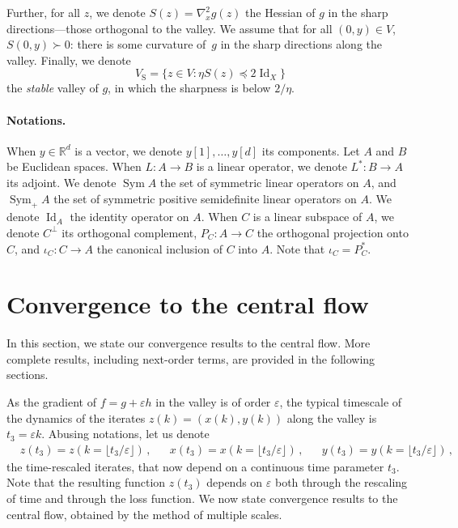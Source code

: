 \documentclass[11pt,english,reqno]{article}
\DeclareMathOperator{\Id}{Id}
\DeclareMathOperator{\Sym}{Sym}
\newcommand{\R}{\mathbb{R}}
\theoremstyle{plain}
\theoremstyle{definition}
\theoremstyle{remark}
\numberwithin{equation}{section}
\begin{document}
Further, for all $z$, we denote $S(z) = \nabla^2_x g(z)$ the Hessian of $g$ in the sharp directions---those orthogonal to the valley. We assume that for all $(0,y) \in V$, $S(0, y) \succ 0$: there is some curvature of~$g$ in the sharp directions along the valley. Finally, we denote 
\begin{equation*}
    V_{\mathrm{S}} = \{ z \in V : \eta S(z) \preccurlyeq 2 \Id_X\} 
\end{equation*}
the \emph{stable} valley of $g$, in which the sharpness is below $2/\eta$. 

\paragraph{Notations.} When $y \in \R^d$ is a vector, we denote $y[1], \dots, y[d]$ its components. Let $A$ and $B$ be Euclidean spaces. When $L: A \to B$ is a linear operator, we denote $L^*: B \to A$ its adjoint. We denote $\Sym A$ the set of symmetric linear operators on $A$, and $\Sym_+ A$ the set of symmetric positive semidefinite linear operators on $A$. We denote $\Id_A$ the identity operator on $A$. When $C$ is a linear subspace of $A$, we denote $C^\perp$ its orthogonal complement, $P_C : A \to C$ the orthogonal projection onto $C$, and $\iota_C : C \to A$ the canonical inclusion of $C$ into $A$. Note that $\iota_C = P_{C}^*$.

\section{Convergence to the central flow}
\label{sec:cf}

In this section, we state our convergence results to the central flow. More complete results, including next-order terms, are provided in the following sections.

As the gradient of $f = g + \varepsilon h$ in the valley is of order $\varepsilon$, the typical timescale of the dynamics of the iterates $z(k) = (x(k), y(k))$ along the valley is $t_3 = \varepsilon k$. Abusing notations, let us denote 
\begin{align*}
    &z(t_3) = z\left(k=\lfloor t_3/\varepsilon \rfloor\right) \, , &&x(t_3) = x\left(k=\lfloor t_3/\varepsilon \rfloor\right) \, , &&y(t_3) = y\left(k=\lfloor t_3/\varepsilon \rfloor\right) \, ,
\end{align*}
the time-rescaled iterates, that now depend on a continuous time parameter $t_3$. Note that the resulting function $z(t_3)$ depends on $\varepsilon$ both through the rescaling of time and through the loss function. We now state convergence results to the central flow, obtained by the method of multiple scales.
\end{document}
